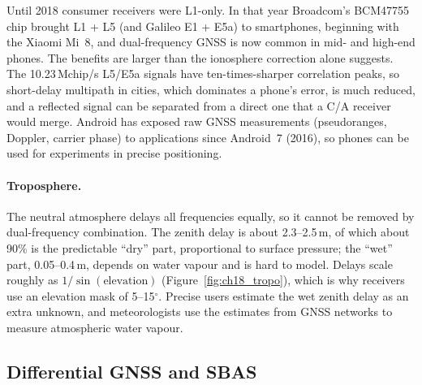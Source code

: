 
\begin{inpractice}
Until 2018 consumer receivers were L1-only. In that year Broadcom's BCM47755 chip brought
L1 + L5 (and Galileo E1 + E5a) to smartphones, beginning with the Xiaomi Mi~8, and
dual-frequency GNSS is now common in mid- and high-end phones. The benefits are larger than the
ionosphere correction alone suggests. The 10.23\,Mchip/s L5/E5a signals have ten-times-sharper
correlation peaks, so short-delay multipath in cities, which dominates a phone's error, is
much reduced, and a reflected signal can be separated from a direct one that a C/A receiver
would merge. Android has exposed raw GNSS measurements (pseudoranges, Doppler, carrier phase)
to applications since Android~7 (2016), so phones can be used for experiments in precise
positioning.
\end{inpractice}


\paragraph{Troposphere.} The neutral atmosphere delays all frequencies equally, so it cannot be
removed by dual-frequency combination. The zenith delay is about 2.3--2.5\,m, of which about
90\% is the predictable ``dry'' part, proportional to surface pressure; the ``wet'' part,
0.05--0.4\,m, depends on water vapour and is hard to model. Delays scale roughly as
$1/\sin(\text{elevation})$ (Figure~\ref{fig:ch18_tropo}), which is why receivers use an elevation
mask of 5--15$^\circ$.
Precise users estimate the wet zenith delay as an extra unknown, and meteorologists use the
estimates from GNSS networks to measure atmospheric water vapour.

\subsection{Differential GNSS and SBAS}
\label{sec:ch18:augmentation}

